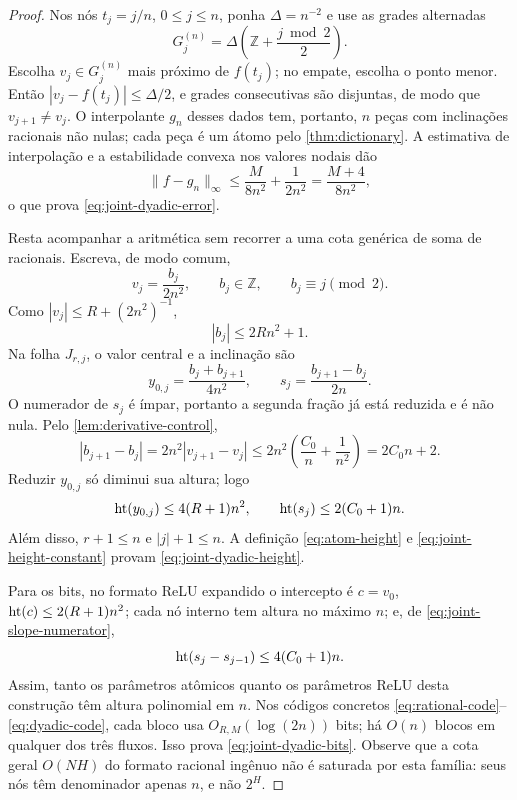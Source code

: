 \begin{proof}
Nos nós $t_j=j/n$, $0\le j\le n$, ponha $\Delta=n^{-2}$ e use as grades
alternadas
\begin{equation}
 G_j^{(n)}=\Delta\left(\mathbb Z+\frac{j\bmod2}{2}\right).
 \label{eq:joint-alternating-grid}
\end{equation}
Escolha $v_j\in G_j^{(n)}$ mais próximo de $f(t_j)$; no empate, escolha o
ponto menor. Então $|v_j-f(t_j)|\le\Delta/2$, e grades consecutivas são
disjuntas, de modo que $v_{j+1}\ne v_j$. O interpolante $g_n$ desses dados
tem, portanto, $n$ peças com inclinações racionais não nulas; cada peça é um
átomo pelo \cref{thm:dictionary}. A estimativa de interpolação e a
estabilidade convexa nos valores nodais dão
\[
 \|f-g_n\|_\infty
 \le\frac{M}{8n^2}+\frac{1}{2n^2}
 =\frac{M+4}{8n^2},
\]
o que prova \eqref{eq:joint-dyadic-error}.

Resta acompanhar a aritmética sem recorrer a uma cota genérica de soma de
racionais. Escreva, de modo comum,
\begin{equation}
 v_j=\frac{b_j}{2n^2},\qquad b_j\in\mathbb Z,
 \qquad b_j\equiv j\pmod2.
 \label{eq:joint-common-denominator}
\end{equation}
Como $|v_j|\le R+(2n^2)^{-1}$,
\begin{equation}
 |b_j|\le2Rn^2+1.
 \label{eq:joint-numerator-bound}
\end{equation}
Na folha $J_{r,j}$, o valor central e a inclinação são
\begin{equation}
 y_{0,j}=\frac{b_j+b_{j+1}}{4n^2},
 \qquad
 s_j=\frac{b_{j+1}-b_j}{2n}.
 \label{eq:joint-atom-parameters}
\end{equation}
O numerador de $s_j$ é ímpar, portanto a segunda fração já está reduzida e é
não nula. Pelo \cref{lem:derivative-control},
\begin{equation}
 |b_{j+1}-b_j|
 =2n^2|v_{j+1}-v_j|
 \le2n^2\left(\frac{C_0}{n}+\frac1{n^2}\right)
 =2C_0n+2.
 \label{eq:joint-slope-numerator}
\end{equation}
Reduzir $y_{0,j}$ só diminui sua altura; logo
\begin{equation}
 \operatorname{ht}(y_{0,j})\le4(R+1)n^2,
 \qquad
 \operatorname{ht}(s_j)\le2(C_0+1)n.
 \label{eq:joint-parameter-heights}
\end{equation}
Além disso, $r+1\le n$ e $|j|+1\le n$. A definição
\eqref{eq:atom-height} e \eqref{eq:joint-height-constant} provam
\eqref{eq:joint-dyadic-height}.

Para os bits, no formato ReLU expandido o intercepto é $c=v_0$,
$\operatorname{ht}(c)\le2(R+1)n^2$; cada nó interno tem altura no máximo $n$; e, de
\eqref{eq:joint-slope-numerator},
\[
 \operatorname{ht}(s_j-s_{j-1})\le4(C_0+1)n.
\]
Assim, tanto os parâmetros atômicos quanto os parâmetros ReLU desta
construção têm altura polinomial em $n$. Nos códigos concretos
\eqref{eq:rational-code}--\eqref{eq:dyadic-code}, cada bloco usa
$O_{R,M}(\log(2n))$ bits; há $O(n)$ blocos em qualquer dos três fluxos. Isso
prova \eqref{eq:joint-dyadic-bits}. Observe que a cota geral
$O(NH)$ do formato racional ingênuo não é saturada por esta família: seus
nós têm denominador apenas $n$, e não $2^H$.


\end{proof}
